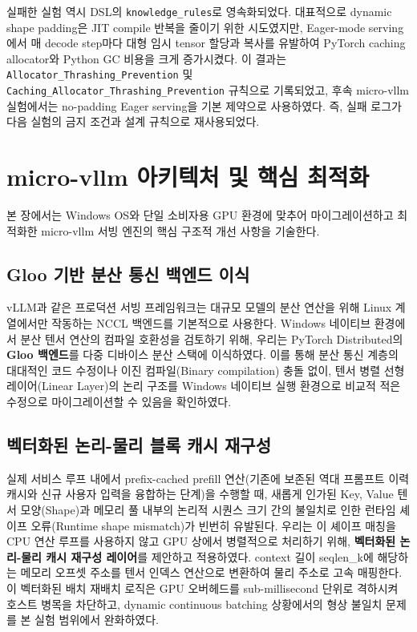 \documentclass{kcc} %
\begin{document}
실패한 실험 역시 DSL의 \texttt{knowledge\_rules}로 영속화되었다. 대표적으로 dynamic shape padding은 JIT compile 반복을 줄이기 위한 시도였지만, Eager-mode serving에서 매 decode step마다 대형 임시 tensor 할당과 복사를 유발하여 PyTorch caching allocator와 Python GC 비용을 크게 증가시켰다. 이 결과는 \texttt{Allocator\_Thrashing\_Prevention} 및 \texttt{Caching\_Allocator\_Thrashing\_Prevention} 규칙으로 기록되었고, 후속 micro-vllm 실험에서는 no-padding Eager serving을 기본 제약으로 사용하였다. 즉, 실패 로그가 다음 실험의 금지 조건과 설계 규칙으로 재사용되었다.


\section{micro-vllm 아키텍처 및 핵심 최적화}

본 장에서는 Windows OS와 단일 소비자용 GPU 환경에 맞추어 마이그레이션하고 최적화한 micro-vllm 서빙 엔진의 핵심 구조적 개선 사항을 기술한다.


\subsection{Gloo 기반 분산 통신 백엔드 이식}

vLLM과 같은 프로덕션 서빙 프레임워크는 대규모 모델의 분산 연산을 위해 Linux 계열에서만 작동하는 NCCL 백엔드를 기본적으로 사용한다. Windows 네이티브 환경에서 분산 텐서 연산의 컴파일 호환성을 검토하기 위해, 우리는 PyTorch Distributed의 \textbf{Gloo 백엔드}를 다중 디바이스 분산 스택에 이식하였다. 이를 통해 분산 통신 계층의 대대적인 코드 수정이나 이진 컴파일(Binary compilation) 충돌 없이, 텐서 병렬 선형 레이어(Linear Layer)의 논리 구조를 Windows 네이티브 실행 환경으로 비교적 적은 수정으로 마이그레이션할 수 있음을 확인하였다.


\subsection{벡터화된 논리-물리 블록 캐시 재구성}

실제 서비스 루프 내에서 prefix-cached prefill 연산(기존에 보존된 역대 프롬프트 이력 캐시와 신규 사용자 입력을 융합하는 단계)을 수행할 때, 새롭게 인가된 Key, Value 텐서 모양(Shape)과 메모리 풀 내부의 논리적 시퀀스 크기 간의 불일치로 인한 런타임 셰이프 오류(Runtime shape mismatch)가 빈번히 유발된다. 우리는 이 셰이프 매칭을 CPU 연산 루프를 사용하지 않고 GPU 상에서 병렬적으로 처리하기 위해, \textbf{벡터화된 논리-물리 캐시 재구성 레이어}를 제안하고 적용하였다. context 길이 seqlen\_k에 해당하는 메모리 오프셋 주소를 텐서 인덱스 연산으로 변환하여 물리 주소로 고속 매핑한다. 이 벡터화된 배치 재배치 로직은 GPU 오버헤드를 sub-millisecond 단위로 격하시켜 호스트 병목을 차단하고, dynamic continuous batching 상황에서의 형상 불일치 문제를 본 실험 범위에서 완화하였다.
\end{document}
